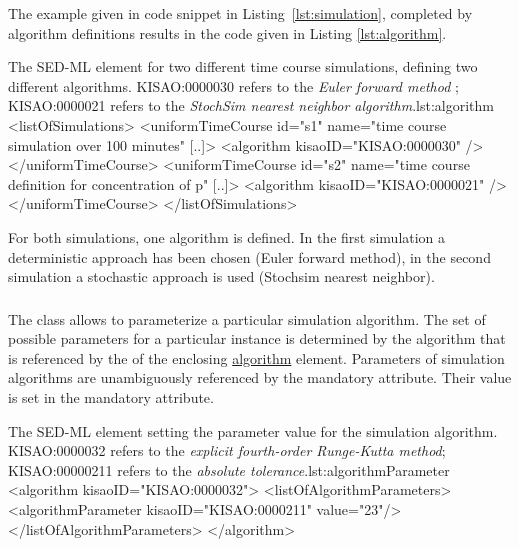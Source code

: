 The example given in code snippet in Listing~\ref{lst:simulation}, completed by algorithm definitions results in the code given in Listing \ref{lst:algorithm}.

\begin{myXmlLst}{The SED-ML  element for two different time course simulations, defining two different algorithms. KISAO:0000030 refers to the \emph{Euler forward method} ; KISAO:0000021 refers to the \emph{StochSim nearest neighbor algorithm}.}{lst:algorithm}
<listOfSimulations>
 <uniformTimeCourse id="s1" name="time course simulation over 100 minutes" [..]>
  <algorithm kisaoID="KISAO:0000030" />
 </uniformTimeCourse>
 <uniformTimeCourse id="s2" name="time course definition for concentration of p" [..]>
  <algorithm kisaoID="KISAO:0000021" />
 </uniformTimeCourse>
</listOfSimulations>
\end{myXmlLst}

For both simulations, one algorithm is defined. In the first simulation  a deterministic approach has been chosen (Euler forward method), in the second simulation  a stochastic approach is used (Stochsim nearest neighbor).


\subsubsection{}
\label{class:algorithmParameter}

The  class allows to parameterize a particular simulation algorithm. The set of possible parameters for a particular instance is determined by the algorithm that is referenced by the  of the enclosing \hyperref[class:algorithm]{algorithm} element. Parameters of simulation algorithms are unambiguously referenced by the mandatory  attribute. Their value is set in the mandatory  attribute.

\begin{myXmlLst}{The SED-ML  element setting the parameter value for the simulation algorithm. KISAO:0000032 refers to the \emph{explicit fourth-order Runge-Kutta method}; KISAO:00000211 refers to the \emph{absolute tolerance}.}{lst:algorithmParameter}
<algorithm kisaoID="KISAO:0000032"> 
  <listOfAlgorithmParameters> 
    <algorithmParameter kisaoID="KISAO:0000211" value="23"/> 
  </listOfAlgorithmParameters> 
</algorithm>
\end{myXmlLst}


